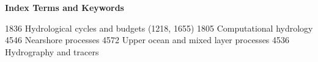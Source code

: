 \textbf{Index Terms and Keywords}

1836 Hydrological cycles and budgets (1218, 1655)
1805 Computational hydrology
4546 Nearshore processes
4572 Upper ocean and mixed layer processes
4536 Hydrography and tracers
  